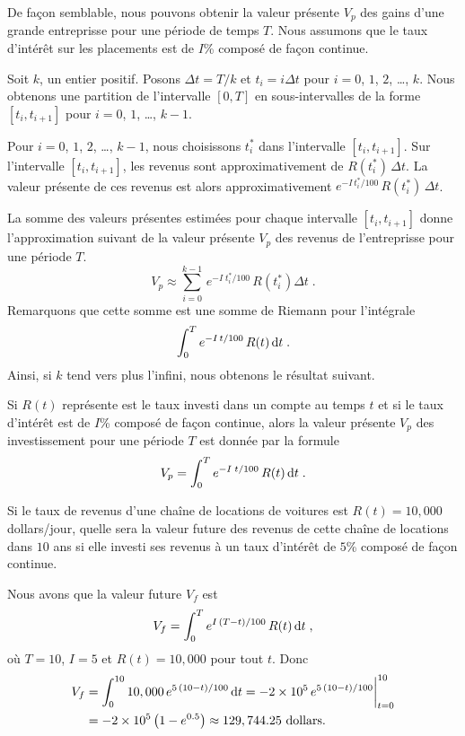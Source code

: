 {De façon semblable, nous pouvons obtenir la valeur présente $V_p$ des gains
d'une grande entreprisse pour une période de temps $T$.  Nous assumons que
le taux d'intérêt sur les placements est de $I$\% composé de façon
continue.

Soit $k$, un entier positif.  Posons
$\Delta t = T/k$ et $t_i = i \Delta t$
pour $i=0$, $1$, $2$, \ldots, $k$.  Nous obtenons une partition de l'intervalle
$[0,T]$ en sous-intervalles de la forme $[t_i,t_{i+1}]$ pour $i=0$, $1$,
\ldots, $k-1$.

Pour $i=0$, $1$, $2$, \ldots, $k-1$, nous choisissons $t_i^\ast$ dans
l'intervalle $[t_i,t_{i+1}]$.  Sur l'intervalle $[t_i, t_{i+1}]$, les
revenus sont
approximativement de $R(t_i^\ast)\, \Delta t$.  La valeur présente de ces
revenus est alors approximativement
$\displaystyle e^{-I\,t_i^\ast/100} \,R(t_i^\ast)\, \Delta t$.

La somme des valeurs présentes estimées pour chaque intervalle
$[t_i,t_{i+1}]$ donne l'approximation suivant de la valeur présente
$V_p$ des revenus de l'entreprisse pour une période $T$.
\[
V_p \approx \sum_{i=0}^{k-1} \,e^{-I\;t_i^\ast/100} \,R(t_i^\ast)
\Delta t \; .
\]
Remarquons que cette somme est une somme de Riemann pour l'intégrale
\[
\int_0^T e^{-I\,t/100} \,R(t) \,\mathrm{d}t \; .
\]
Ainsi, si $k$ tend vers plus l'infini, nous obtenons le résultat suivant.

\begin{meth} 
Si $R(t)$ représente est le taux investi dans un compte au temps $t$
et si le taux d'intérêt est de $I$\% composé de façon continue, alors la
valeur présente $V_p$ des investissement pour une période $T$ est
donnée par la formule
\[
V_p = \int_0^T e^{-I\;t/100} \,R(t) \,\mathrm{d}t \; .
\]
\end{meth}

\begin{egg}
Si le taux de revenus d'une chaîne de locations de voitures est
$R(t) = 10,000$ dollars/jour, quelle sera la valeur future des revenus
de cette chaîne de locations dans $10$ ans si elle investi ses revenus
à un taux d'intérêt de $5$\% composé de façon continue.

Nous avons que la valeur future $V_f$ est
\[
V_f = \int_0^T e^{I\,(T-t)/100} \,R(t) \,\mathrm{d}t \; ,
\]
où $T=10$, $I=5$ et $R(t)=10,000$ pour tout $t$.  Donc
\begin{align*}
V_f &= \int_0^{10} 10,000\, e^{5\,(10-t)/100} \,\mathrm{d}t
= -2\times 10^5\, e^{5\,(10-t)/100} \bigg|_{t=0}^{10} \\
&= -2\times 10^5 \left(1-e^{0.5}\right) \approx 129,744.25 \text{ dollars}.
\end{align*}
\end{egg}

}
